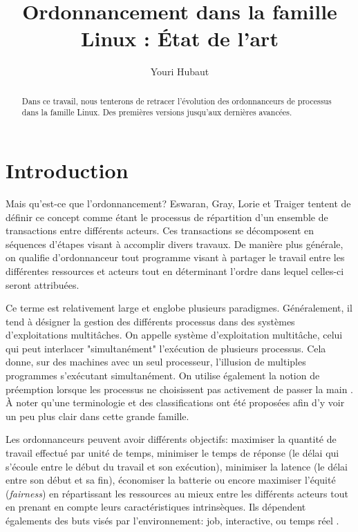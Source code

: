 \documentclass[letterpaper]{article}
\title{Ordonnancement dans la famille Linux : État de l'art}
\author{Youri Hubaut}
\begin{document}
\maketitle

\begin{abstract}

Dans ce travail, nous tenterons de retracer l'évolution des ordonnanceurs de processus dans la famille Linux. Des premières versions jusqu'aux dernières avancées.

\end{abstract}

\section{Introduction}

Mais qu'est-ce que l'ordonnancement? Eswaran, Gray, Lorie et Traiger \citep{Eswaran:1976:NPC:360363.360369} tentent de définir ce concept comme étant le processus de répartition d'un ensemble de transactions entre différents acteurs. Ces transactions se décomposent en séquences d'étapes visant à accomplir divers travaux. De manière plus générale, on qualifie d'ordonnanceur tout programme visant à partager le travail entre les différentes ressources et acteurs tout en déterminant l'ordre dans lequel celles-ci seront attribuées.

Ce terme est relativement large et englobe plusieurs paradigmes. Généralement, il tend à désigner la gestion des différents processus dans des systèmes d'exploitations multitâches. On appelle système d'exploitation multitâche, celui qui peut interlacer "simultanément" l'exécution de plusieurs processus. Cela donne, sur des machines avec un seul processeur, l'illusion de multiples programmes s'exécutant simultanément. On utilise également la notion de préemption lorsque les processus ne choisissent pas activement de passer la main \citep{Bach:1986:DUO:8570}. À noter qu'une terminologie \citep{Casavant:1988:TSG:630789.630963} et des classifications \citep{DBLP:journals/tc/WangM85} ont été proposées afin d'y voir un peu plus clair dans cette grande famille.

Les ordonnanceurs peuvent avoir différents objectifs: maximiser la quantité de travail effectué par unité de temps, minimiser le temps de réponse (le délai qui s'écoule entre le début du travail et son exécution), minimiser la latence (le délai entre son début et sa fin), économiser la batterie ou encore maximiser l'équité (\textit{fairness}) en répartissant les ressources au mieux entre les différents acteurs tout en prenant en compte leurs caractéristiques intrinsèques.
Ils dépendent égalements des buts visés par l'environnement: job, interactive, ou temps réel \citep{Hansen:1973:OSP:540365}.
\end{document}
